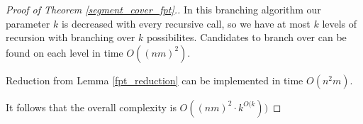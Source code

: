 \begin{proof}[Proof of Theorem \ref{segment_cover_fpt}.]
In this branching algorithm our parameter $k$ is decreased with every
recursive call, so we have at most $k$ levels of recursion with
branching over $k$ possibilites. Candidates to branch over
can be found on each level in time $O((nm)^2)$.

Reduction from Lemma \ref{fpt_reduction} can be implemented in time $O(n^2m)$.

It follows that the overall complexity is $O((nm)^2 \cdot k^{O(k}))$
\end{proof}

